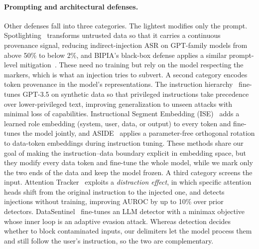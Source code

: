 \documentclass{article}
\begin{document}
\paragraph{Prompting and architectural defenses.} Other defenses fall into three categories. The lightest modifies only the prompt. Spotlighting~\cite{hines2024spotlighting} transforms untrusted data so that it carries a continuous provenance signal, reducing indirect-injection ASR on GPT-family models from above 50\% to below 2\%, and BIPIA's black-box defense applies a similar prompt-level mitigation~\cite{yi2023bipia}. These need no training but rely on the model respecting the markers, which is what an injection tries to subvert. A second category encodes token provenance in the model's representations. The instruction hierarchy~\cite{wallace2024hierarchy} fine-tunes GPT-3.5 on synthetic data so that privileged instructions take precedence over lower-privileged text, improving generalization to unseen attacks with minimal loss of capabilities. Instructional Segment Embedding (ISE)~\cite{wu2024ise} adds a learned role embedding (system, user, data, or output) to every token and fine-tunes the model jointly, and ASIDE~\cite{zverev2025aside} applies a parameter-free orthogonal rotation to data-token embeddings during instruction tuning. These methods share our goal of making the instruction--data boundary explicit in embedding space, but they modify every data token and fine-tune the whole model, while we mark only the two ends of the data and keep the model frozen. A third category screens the input. Attention Tracker~\cite{hung2024attention} exploits a \emph{distraction effect}, in which specific attention heads shift from the original instruction to the injected one, and detects injections without training, improving AUROC by up to 10\% over prior detectors. DataSentinel~\cite{liu2025datasentinel} fine-tunes an LLM detector with a minimax objective whose inner loop is an adaptive evasion attack. Whereas detection decides whether to block contaminated inputs, our delimiters let the model process them and still follow the user's instruction, so the two are complementary.
\end{document}
